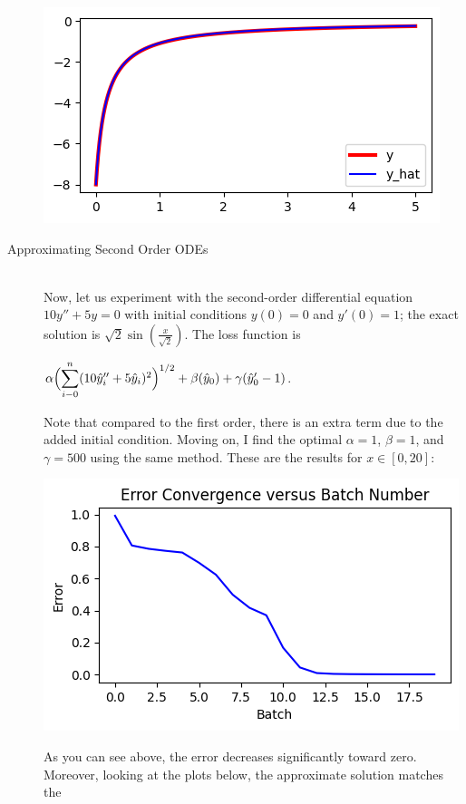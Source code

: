 \documentclass[12pt]{article}
\newcommand{\dsum}[2]{\mathlarger{\sum}_{#1}^{#2}}
\newcommand{\bgc}{\begin{center}}
\newcommand{\enc}{\end{center}}
\begin{document}
\begin{description}
\begin{minipage}{\linewidth}
        \includegraphics[scale=.5]{images/figure8.png}
    \end{minipage}

    \item[Approximating Second Order ODEs] \hfill \\
    Now, let us experiment with the second-order differential equation $10y''+
    5y = 0$ with initial conditions  $y(0) = 0$ and $y'(0) = 1$; the exact
    solution is $\sqrt{2}\sin(\frac{x}{\sqrt{2}})$. The loss function is 
    \bgc 
    $\alpha\Bigl(\dsum{i-0}{n}(10\hat{y}_i'' + 5\hat{y}_i)^2\Bigr)^{1/2} 
    + \beta(\hat{y}_0)
    + \gamma(\hat{y}_0' - 1)$.
    \enc
    Note that compared to the first order, there is an extra term due to the
    added initial condition. Moving on, I find the optimal $\alpha = 1$, $\beta
    = 1$, and $\gamma = 500$ using the same method. These are the results
    for $x\in[0, 20]$: \\
    \begin{minipage}{\linewidth}
        \centering
        \includegraphics[scale=.5]{images/figure9.png}
    \end{minipage}
    As you can see above, the error decreases significantly toward zero.
    Moreover, looking at the plots below, the approximate solution matches the

\end{description}
\end{document}
